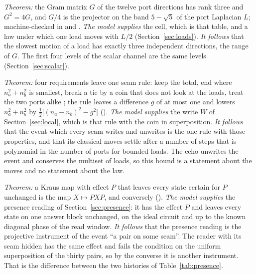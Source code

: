 \documentclass[11pt]{article}
\theoremstyle{definition}
\theoremstyle{remark}
\theoremstyle{plain}
\begin{document}
\begin{description}[leftmargin=1.2em,itemsep=3pt]
\item[The carrier.] \emph{Theorem:} the Gram matrix $G$ of the twelve port
directions has rank three and $G^2=4G$, and $G/4$ is the projector on the
band $5-\sqrt5$ of the port Laplacian $L$; machine-checked in
 and
 \cite{ophmicro}. \emph{The model
supplies} the cell, which is that table, and a law under which one load
moves with $L/2$ (Section~\ref{sec:loads}). \emph{It follows} that the
slowest motion of a load has exactly three independent directions, the
range of $G$. The first four levels of the scalar channel are the same
levels (Section~\ref{sec:scalar}).

\item[The seam rule.] \emph{Theorem:} four requirements leave one seam
rule: keep the total, end where $n_a^2+n_b^2$ is smallest, break a tie by a
coin that does not look at the loads, treat the two ports alike
\cite{ophmicro}; the rule leaves a difference $g$ of at most one and
lowers $n_a^2+n_b^2$ by $\tfrac12\bigl[(n_a-n_b)^2-g^2\bigr]$
(). \emph{The
model supplies} the write $W$ of Section~\ref{sec:local}, which is that
rule with the coin in superposition. \emph{It follows} that the event
which every seam writes and unwrites is the one rule with those
properties, and that its classical moves settle after a number of steps
that is polynomial in the number of ports for bounded loads. The echo
unwrites the event and conserves the multiset of loads, so this bound is a
statement about the moves and no statement about the law.

\item[The projective instrument.] \emph{Theorem:} a Kraus map with effect
$P$ that leaves every state certain for $P$ unchanged is the map
$X\mapsto PXP$, and conversely
().
\emph{The model supplies} the presence reading of
Section~\ref{sec:presence}: it has the effect $P$ and leaves every state on
one answer block unchanged, on the ideal circuit and up to the known
diagonal phase of the read window. \emph{It follows} that the presence
reading is the projective instrument of the event ``a pair on some seam''.
The reader with its seam hidden has the same effect and fails the
condition on the uniform superposition of the thirty pairs, so by the
converse it is another instrument. That is the difference between the two
histories of Table~\ref{tab:presence}.


\end{description}
\end{document}
